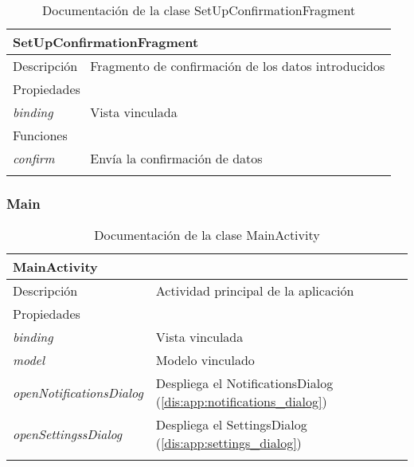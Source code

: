 \vspace{-20pt}
\begin{longtable}{|p{} p{}|}
    \hline
    \multicolumn{2}{|l|}{\textbf{SetUpConfirmationFragment}} \\ \hline \hline
    Descripción      & Fragmento de confirmación de los datos introducidos \\ \hline
    \multicolumn{2}{|l|}{Propiedades} \\
    \emph{binding}  & Vista vinculada  \\ \hline
    \multicolumn{2}{|l|}{Funciones} \\
    \emph{confirm}  & Envía la confirmación de datos  \\ \hline
    \caption{Documentación de la clase SetUpConfirmationFragment}
    \label{dis:app:setup_confirmation_fragment}
\end{longtable}

\vspace{-20pt}
\subsubsection{Main}

\begin{longtable}{|p{} p{}|}
    \hline
    \multicolumn{2}{|l|}{\textbf{MainActivity}} \\ \hline \hline
    Descripción      & Actividad principal de la aplicación \\ \hline
    \multicolumn{2}{|l|}{Propiedades} \\
    \emph{binding}  & Vista vinculada  \\
    \emph{model}  & Modelo vinculado  \\
    \emph{openNotificationsDialog}  & Despliega el NotificationsDialog (\ref{dis:app:notifications_dialog}) \\ 
    \emph{openSettingssDialog}  & Despliega el SettingsDialog (\ref{dis:app:settings_dialog}) \\ \hline
    \caption{Documentación de la clase MainActivity}
    \label{dis:app:main_activity}
\end{longtable}

